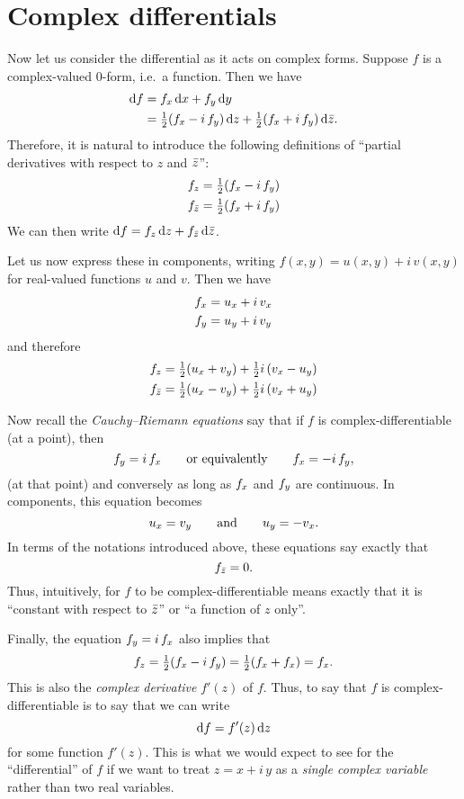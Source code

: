 \section{Complex differentials}
\label{sec:complex-differentials}

Now let us consider the differential as it acts on complex forms.
Suppose $f$ is a complex-valued 0-form, i.e.\ a function.
Then we have
\begin{align*}
  {\ensuremath{\mathrm{d} f}} &= {f}_{x} \, {\mathrm{d} x} + {f}_{y}\,{\mathrm{d} y}\\
  &= \textstyle\frac{1}{2} ({f}_{x} - i\, {f}_{y})\,{\mathrm{d} z} + \textstyle\frac{1}{2} ({f}_{x} + i\, {f}_{y})\,{\mathrm{d} \bar{z}}.
\end{align*}
Therefore, it is natural to introduce the following definitions of ``partial derivatives with respect to $z$ and $\bar{z}$'':
\begin{align*}
  {f}_{z} &= \textstyle\frac{1}{2} ({f}_{x} - i\, {f}_{y})\\
  {f}_{\bar{z}} &= \textstyle\frac{1}{2} ({f}_{x} + i\, {f}_{y})
\end{align*}
We can then write ${\mathrm{d} f} = {f}_{z} \,{\mathrm{d} z} + {f}_{\bar{z}} \,{\mathrm{d} \bar{z}}$.

Let us now express these in components, writing $f(x,y) = u(x,y) + i\,v(x,y)$ for real-valued functions $u$ and $v$.
Then we have
\begin{align*}
  {f}_{x} &= {u}_{x} + i\, {v}_{x}\\
  {f}_{y} &= {u}_{y} + i\, {v}_{y}
\end{align*}
and therefore
\begin{align*}
  {f}_{z} &= \textstyle\frac{1}{2} ({u}_{x} + {v}_{y}) + \textstyle\frac{1}{2} i\, ({v}_{x} - {u}_{y})\\
  {f}_{\bar{z}} &= \textstyle\frac{1}{2} ({u}_{x} - {v}_{y}) + \textstyle\frac{1}{2} i\, ({v}_{x} + {u}_{y})
\end{align*}

Now recall the \emph{Cauchy--Riemann equations} say that if $f$ is complex-differentiable (at a point), then
\[ {f}_{y} = i\,{f}_{x} \qquad\text{or equivalently}\qquad {f}_{x} = - i\,{f}_{y},\]
(at that point) and conversely as long as ${f}_{x}$ and ${f}_{y}$ are continuous.
In components, this equation becomes
\[ {u}_{x} = {v}_{y} \qquad\text{and}\qquad {u}_{y} = - {v}_{x}. \]
In terms of the notations introduced above, these equations say exactly that
\[ {f}_{\bar{z}} = 0. \]
Thus, intuitively, for $f$ to be complex-differentiable means exactly that it is ``constant with respect to $\bar{z}$'' or ``a function of $z$ only''.

Finally, the equation ${f}_{y} = i\,{f}_{x}$ also implies that
\[ {f}_{z} = \textstyle\frac{1}{2}({f}_{x} - i\,{f}_{y}) = \textstyle\frac{1}{2} ({f}_{x} + {f}_{x}) = {f}_{x}.\]
This is also the \emph{complex derivative} $f'(z)$ of $f$.
Thus, to say that $f$ is complex-differentiable is to say that we can write
\[ {\mathrm{d} f} = f'(z) \,{\mathrm{d} z} \]
for some function $f'(z)$.
This is what we would expect to see for the ``differential'' of $f$ if we want to treat $z = x+i\,y$ as a \emph{single complex variable} rather than two real variables.


